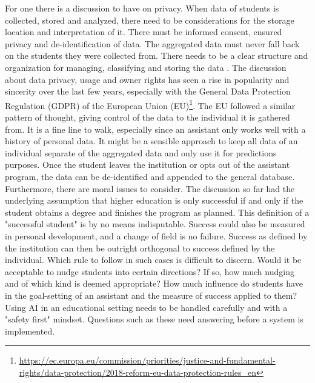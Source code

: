 For one there is a discussion to have on privacy. When data of students is collected, stored and analyzed, there need to be considerations for the storage location and interpretation of it. There must be informed consent, ensured privacy and de-identification of data. The aggregated data must never fall back on the students they were collected from. There needs to be a clear structure and organization for managing, classifying and storing the data \cite{Slade.2013}. The discussion about data privacy, usage and owner rights has seen a rise in popularity and sincerity over the last few years, especially with the General Data Protection Regulation (GDPR) of the European Union (EU)\footnote{\url{https://ec.europa.eu/commission/priorities/justice-and-fundamental-rights/data-protection/2018-reform-eu-data-protection-rules_en}}. The EU followed a similar pattern of thought, giving control of the data to the individual it is gathered from. It is a fine line to walk, especially since an assistant only works well with a history of personal data. It might be a sensible approach to keep all data of an individual separate of the aggregated data and only use it for predictions purposes. Once the student leaves the institution or opts out of the assistant program, the data can be de-identified and appended to the general database.\\
Furthermore, there are moral issues to consider. The discussion so far had the underlying assumption that higher education is only successful if and only if the student obtains a degree and finishes the program as planned. This definition of a "successful student" is by no means indisputable. Success could also be measured in personal development, and a change of field is no failure. Success as defined by the institution can then be outright orthogonal to success defined by the individual. Which rule to follow in such cases is difficult to discern. Would it be acceptable to nudge students into certain directions? If so, how much nudging and of which kind is deemed appropriate? How much influence do students have in the goal-setting of an assistant and the measure of success applied to them? Using AI in an educational setting needs to be handled carefully and with a "safety first" mindset. Questions such as these need answering before a system is implemented.